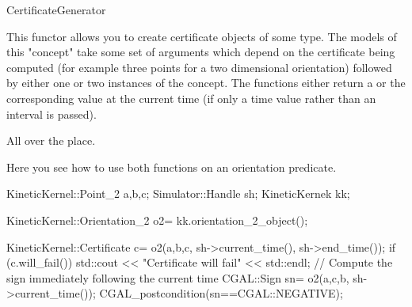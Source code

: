 
\begin{ccRefConcept}[Kinetic::]{CertificateGenerator}


\ccDefinition
  
This functor allows you to create certificate objects of some type.
The models of this "concept" take some set of arguments which depend
on the certificate being computed (for example three points for a two
dimensional orientation) followed by either one or two instances of
the  concept. The functions either
return a  or the corresponding value at the current
time (if only a time value rather than an interval is passed).




\ccOperations




\ccHasModels

All over the place.

\ccSeeAlso


\ccExample

Here you see how to use both functions on an orientation predicate.

\begin{ccExampleCode}
KineticKernel::Point_2 a,b,c;
Simulator::Handle sh;
KineticKernek kk;

KineticKernel::Orientation_2 o2= kk.orientation_2_object();

KineticKernel::Certificate c= o2(a,b,c, sh->current_time(), sh->end_time());
if (c.will_fail()) {
  std::cout << "Certificate will fail" << std::endl;
}
// Compute the sign immediately following the current time
CGAL::Sign sn= o2(a,c,b, sh->current_time());
CGAL_postcondition(sn==CGAL::NEGATIVE);

\end{ccExampleCode}


\end{ccRefConcept}



